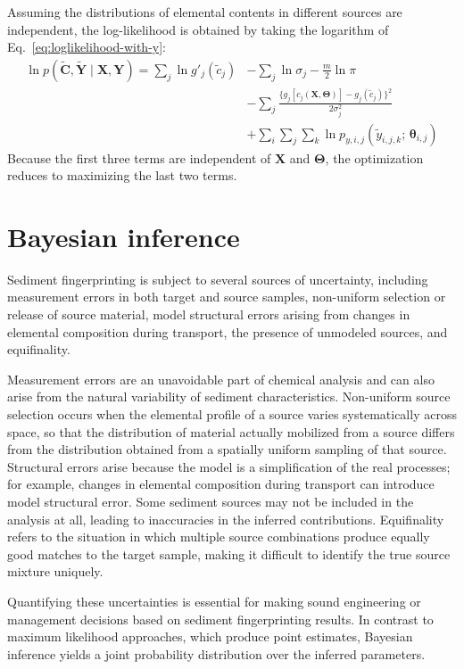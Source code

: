 Assuming the distributions of elemental contents in different sources are independent, the log-likelihood is obtained by taking the logarithm of Eq.~\eqref{eq:loglikelihood-with-y}:
\begin{equation}
\begin{split}
    \ln p(\tilde{\mathbf{C}}, \tilde{\mathbf{Y}} \mid \mathbf{X}, \mathbf{Y}) = \sum_j \ln g'_j(\tilde{c}_j) &- \sum_j \ln \sigma_j - \frac{m}{2}\ln \pi \\
    &- \sum_j \frac{\{g_j[c_j(\mathbf{X}, \bm{\Theta})] - g_j(\tilde{c}_j)\}^2}{2\sigma_j^2} \\
    &+ \sum_i \sum_j \sum_k \ln p_{y,i,j}(\tilde{y}_{i,j,k};\, \bm{\theta}_{i,j})
\end{split}
\end{equation}
Because the first three terms are independent of $\mathbf{X}$ and $\bm{\Theta}$, the optimization reduces to maximizing the last two terms.

\section{Bayesian inference}\label{sec:basic_concepts_bayesian}
Sediment fingerprinting is subject to several sources of uncertainty, including measurement errors in both target and source samples, non-uniform selection or release of source material, model structural errors arising from changes in elemental composition during transport, the presence of unmodeled sources, and equifinality.

Measurement errors are an unavoidable part of chemical analysis and can also arise from the natural variability of sediment characteristics. Non-uniform source selection occurs when the elemental profile of a source varies systematically across space, so that the distribution of material actually mobilized from a source differs from the distribution obtained from a spatially uniform sampling of that source. Structural errors arise because the model is a simplification of the real processes; for example, changes in elemental composition during transport can introduce model structural error. Some sediment sources may not be included in the analysis at all, leading to inaccuracies in the inferred contributions. Equifinality refers to the situation in which multiple source combinations produce equally good matches to the target sample, making it difficult to identify the true source mixture uniquely.

Quantifying these uncertainties is essential for making sound engineering or management decisions based on sediment fingerprinting results. In contrast to maximum likelihood approaches, which produce point estimates, Bayesian inference yields a joint probability distribution over the inferred parameters.

